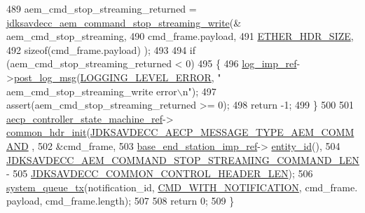 \begin{DoxyCode}
489     aem\_cmd\_stop\_streaming\_returned = 
      \hyperlink{group__command__stop__streaming_gab694a591019d29c8fa77482ac3a43f88}{jdksavdecc\_aem\_command\_stop\_streaming\_write}(&
      aem\_cmd\_stop\_streaming,
490                                                                                   cmd\_frame.payload,
491                                                                                   
      \hyperlink{namespaceavdecc__lib_a6c827b1a0d973e18119c5e3da518e65ca9512ad9b34302ba7048d88197e0a2dc0}{ETHER\_HDR\_SIZE},
492                                                                                   \textcolor{keyword}{sizeof}(cmd\_frame.payload)
      );
493 
494     \textcolor{keywordflow}{if} (aem\_cmd\_stop\_streaming\_returned < 0)
495     \{
496         \hyperlink{namespaceavdecc__lib_acbe3e2a96ae6524943ca532c87a28529}{log\_imp\_ref}->\hyperlink{classavdecc__lib_1_1log_a68139a6297697e4ccebf36ccfd02e44a}{post\_log\_msg}(\hyperlink{namespaceavdecc__lib_a501055c431e6872ef46f252ad13f85cdaf2c4481208273451a6f5c7bb9770ec8a}{LOGGING\_LEVEL\_ERROR}, \textcolor{stringliteral}{"
      aem\_cmd\_stop\_streaming\_write error\(\backslash\)n"});
497         assert(aem\_cmd\_stop\_streaming\_returned >= 0);
498         \textcolor{keywordflow}{return} -1;
499     \}
500 
501     \hyperlink{namespaceavdecc__lib_a0b1b5aea3c0490f77cbfd9178af5be22}{aecp\_controller\_state\_machine\_ref}->
      \hyperlink{classavdecc__lib_1_1aecp__controller__state__machine_aafc737d7ed17a62fed9df6528f18d3ec}{common\_hdr\_init}(\hyperlink{group__aecp__message__type_ga4625ce189cc209f42deb0629f48faf69}{JDKSAVDECC\_AECP\_MESSAGE\_TYPE\_AEM\_COMMAND}
      ,
502                                                        &cmd\_frame,
503                                                        \hyperlink{classavdecc__lib_1_1descriptor__base__imp_a550c969411f5f3b69f55cc139763d224}{base\_end\_station\_imp\_ref}->
      \hyperlink{classavdecc__lib_1_1end__station__imp_a363b6c9664a0d701def9b17863e20ad3}{entity\_id}(),
504                                                        
      \hyperlink{group__command__stop__streaming_ga37e2bec2217af78aed138bbf254234d0}{JDKSAVDECC\_AEM\_COMMAND\_STOP\_STREAMING\_COMMAND\_LEN} -
505                                                            
      \hyperlink{group__jdksavdecc__avtp__common__control__header_gaae84052886fb1bb42f3bc5f85b741dff}{JDKSAVDECC\_COMMON\_CONTROL\_HEADER\_LEN});
506     \hyperlink{namespaceavdecc__lib_a6dd511685627c0865a3442b539a4e8e9}{system\_queue\_tx}(notification\_id, \hyperlink{namespaceavdecc__lib_aabcadff06aa62be0ce47bc0646823604aba48b8a017e06fb240b650cdea965178}{CMD\_WITH\_NOTIFICATION}, cmd\_frame.
      payload, cmd\_frame.length);
507 
508     \textcolor{keywordflow}{return} 0;
509 \}
\end{DoxyCode}


